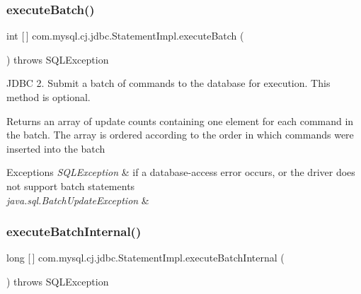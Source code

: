\subsubsection{\texorpdfstring{execute\+Batch()}{executeBatch()}}
{\footnotesize\ttfamily int \mbox{[}$\,$\mbox{]} com.\+mysql.\+cj.\+jdbc.\+Statement\+Impl.\+execute\+Batch (\begin{DoxyParamCaption}{ }\end{DoxyParamCaption}) throws S\+Q\+L\+Exception}

J\+D\+BC 2. Submit a batch of commands to the database for execution. This method is optional.

\begin{DoxyReturn}{Returns}
an array of update counts containing one element for each command in the batch. The array is ordered according to the order in which commands were inserted into the batch
\end{DoxyReturn}

\begin{DoxyExceptions}{Exceptions}
{\em S\+Q\+L\+Exception} & if a database-\/access error occurs, or the driver does not support batch statements \\
\hline
{\em java.\+sql.\+Batch\+Update\+Exception} & \\
\hline
\end{DoxyExceptions}
\mbox{\label{classcom_1_1mysql_1_1cj_1_1jdbc_1_1_statement_impl_abd879bf637f7f3ba5e74050912735836}} 
\subsubsection{\texorpdfstring{execute\+Batch\+Internal()}{executeBatchInternal()}}
{\footnotesize\ttfamily long \mbox{[}$\,$\mbox{]} com.\+mysql.\+cj.\+jdbc.\+Statement\+Impl.\+execute\+Batch\+Internal (\begin{DoxyParamCaption}{ }\end{DoxyParamCaption}) throws S\+Q\+L\+Exception\hspace{0.3cm}{\ttfamily [protected]}}

\mbox{\label{classcom_1_1mysql_1_1cj_1_1jdbc_1_1_statement_impl_ad5138e585c47eef34667efe73d0a954f}} 
